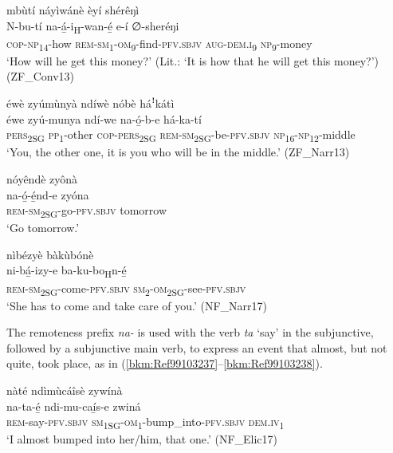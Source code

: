 \ea
\label{bkm:Ref74908458}
mbùtí náyìwánè èyí shérêŋì\\
\gll N-bu-tí    na-á̲-i\textsubscript{H}-wan-é̲      e-í    ∅-sheréŋi\\
\textsc{cop}-\textsc{np}\textsubscript{14}-how  \textsc{rem}-\textsc{sm}\textsubscript{1}-\textsc{om}\textsubscript{9}-find-\textsc{pfv}.\textsc{sbjv}  \textsc{aug}-\textsc{dem}.\textsc{i}\textsubscript{9}  \textsc{np}\textsubscript{9}-money\\
\glt ‘How will he get this money?’ (Lit.: ‘It is how that he will get this money?’) (ZF\_Conv13)
\z

\ea
\label{bkm:Ref74908459}
éwè zyúmùnyà ndíwè nóbè háꜝkátì\\
\gll éwe    zyú-munya ndí-we  na-ó̲-b-e      há-ka-tí\\
\textsc{pers}\textsubscript{2SG}  \textsc{pp}\textsubscript{1}-other
\textsc{cop}-\textsc{pers}\textsubscript{2SG}  \textsc{rem}-\textsc{sm}\textsubscript{2SG}-be-\textsc{pfv}.\textsc{sbjv}  \textsc{np}\textsubscript{16}-\textsc{np}\textsubscript{12}-middle\\
\glt ‘You, the other one, it is you who will be in the middle.’ (ZF\_Narr13)
\z

\ea
\label{bkm:Ref74908501}
nóyêndè zyônà\\
\gll na-ó̲-é̲nd-e      zyóna\\
\textsc{rem}-\textsc{sm}\textsubscript{2SG}-go-\textsc{pfv}.\textsc{sbjv}  tomorrow\\
\glt ‘Go tomorrow.’
\z

\ea
\label{bkm:Ref74908502}
nìbézyè bàkùbónè\\
\gll ni-bá̲-izy-e      ba-ku-bo\textsubscript{H}n-é̲\\
\textsc{rem}-\textsc{sm}\textsubscript{2SG}-come-\textsc{pfv}.\textsc{sbjv}  \textsc{sm}\textsubscript{2}-\textsc{om}\textsubscript{2SG}-see-\textsc{pfv}.\textsc{sbjv}\\
\glt ‘She has to come and take care of you.’ (NF\_Narr17)
\z

The remoteness prefix \textit{na-} is used with the verb \textit{ta} ‘say’ in the subjunctive, followed by a subjunctive main verb, to express an event that almost, but not quite, took place, as in (\ref{bkm:Ref99103237}--\ref{bkm:Ref99103238}).

\ea
\label{bkm:Ref99103237}
nàté ndìmùcáîsè zywínà\\
\gll na-ta-é̲    ndi-mu-caí̲s-e      zwiná\\
\textsc{rem}-say-\textsc{pfv}.\textsc{sbjv}  \textsc{sm}\textsubscript{1SG}-\textsc{om}\textsubscript{1}-bump\_into-\textsc{pfv}.\textsc{sbjv}  \textsc{dem}.\textsc{iv}\textsubscript{1}\\
\glt ‘I almost bumped into her/him, that one.’ (NF\_Elic17)
\z

